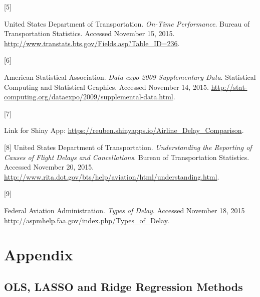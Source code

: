 \documentclass{article} %
\begin{document}
\hypertarget{Ref5}{[5]}United States Department of Transportation. \textit{On-Time Performance}. Bureau of Transportation Statistics. Accessed November 15, 2015. \url{http://www.transtats.bts.gov/Fields.asp?Table_ID=236}.

\hypertarget{Ref6}{[6]}American Statistical Association. \textit{Data expo 2009 Supplementary Data}. Statistical Computing and Statistical Graphics. Accessed November 14, 2015. \url{http://stat-computing.org/dataexpo/2009/supplemental-data.html}.

\hypertarget{Ref7}{[7]} Link for Shiny App: \url{https://reuben.shinyapps.io/Airline_Delay_Comparison}.

[8] United States Department of Transportation. \textit{Understanding the Reporting of Causes of Flight Delays and Cancellations}. Bureau of Transportation Statistics. Accessed November 20, 2015. \url{http://www.rita.dot.gov/bts/help/aviation/html/understanding.html}.

\hypertarget{Ref9}{[9]} Federal Aviation Administration. \textit{Types of Delay}. Accessed November 18, 2015 \url{http://aspmhelp.faa.gov/index.php/Types_of_Delay}.

\clearpage
\newpage

\section{Appendix}
\label{headings}


\subsection{OLS, LASSO and Ridge Regression Methods}
\label{appendix_regression}
\end{document}
